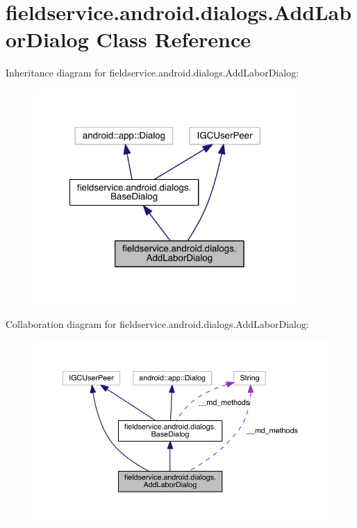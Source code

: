 \hypertarget{classfieldservice_1_1android_1_1dialogs_1_1_add_labor_dialog}{\section{fieldservice.\+android.\+dialogs.\+Add\+Labor\+Dialog Class Reference}
\label{classfieldservice_1_1android_1_1dialogs_1_1_add_labor_dialog}
}


Inheritance diagram for fieldservice.\+android.\+dialogs.\+Add\+Labor\+Dialog\+:
\nopagebreak
\begin{figure}[H]
\begin{center}
\leavevmode
\includegraphics[width=286pt]{classfieldservice_1_1android_1_1dialogs_1_1_add_labor_dialog__inherit__graph}
\end{center}
\end{figure}


Collaboration diagram for fieldservice.\+android.\+dialogs.\+Add\+Labor\+Dialog\+:
\nopagebreak
\begin{figure}[H]
\begin{center}
\leavevmode
\includegraphics[width=350pt]{classfieldservice_1_1android_1_1dialogs_1_1_add_labor_dialog__coll__graph}
\end{center}
\end{figure}
